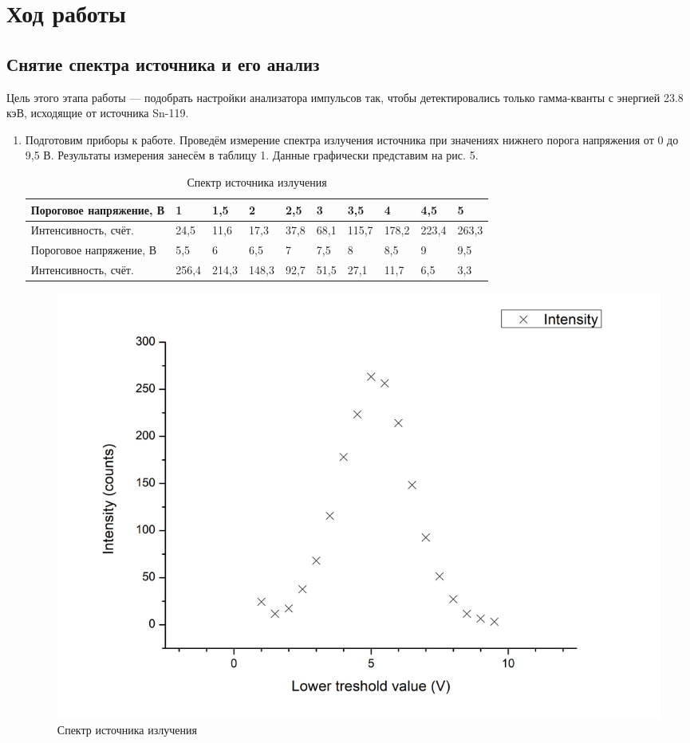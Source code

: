 \documentclass[a4paper]{article}
\begin{document}
\section{Ход работы}

\subsection{Снятие спектра источника и его анализ}

Цель этого этапа работы — подобрать настройки анализатора импульсов так, чтобы детектировались только гамма-кванты с энергией 23.8 кэВ, исходящие от источника Sn-119.

\begin{enumerate}
    \item Подготовим приборы к работе. Проведём измерение спектра излучения источника при значениях нижнего порога напряжения от 0 до 9,5 В. Результаты измерения занесём в таблицу 1. Данные графически представим на рис. 5.
    
    \begin{table}[h]
    \centering
    \begin{center}
    \caption{Спектр источника излучения}
    \end{center}
    \vspace{0.1cm}
    \label{tab:my_label}
    \begin{tabular}{ |p{3.5cm}||p{1cm}|p{1cm}|p{1cm}|p{1cm}|p{1cm}|p{1cm}|p{1cm}|p{1cm}|p{1cm}|}
 \hline
 Пороговое напряжение, В & 1 & 1,5 & 2 & 2,5 & 3 & 3,5 & 4 & 4,5 & 5 \\
\hline
 Интенсивность, счёт. & 24,5 & 11,6 & 17,3 & 37,8 & 68,1 & 115,7 & 178,2 & 223,4 & 263,3\\
\hline
\hline
 Пороговое напряжение, В & 5,5 & 6 & 6,5 & 7 & 7,5 & 8 & 8,5 & 9 & 9,5 \\
 \hline
 Интенсивность, счёт.  & 256,4 & 214,3 & 148,3 & 92,7 & 51,5 & 27,1 & 11,7 & 6,5 & 3,3 \\
 \hline
\end{tabular}
\end{table} 

\begin{figure}[h]
    \centering
    \includegraphics[width=\textwidth]{Graph1}
    \caption{Спектр источника излучения}
    \label{fig:vac}
\end{figure}


\end{enumerate}
\end{document}
